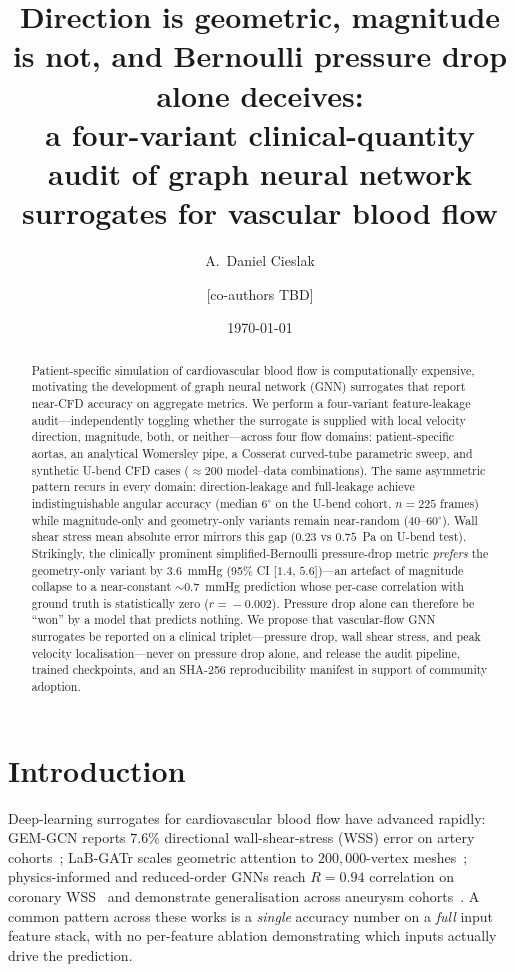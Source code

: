 \documentclass[10pt,a4paper]{article}
\title{\bfseries Direction is geometric, magnitude is not, and Bernoulli
pressure drop alone deceives:\\
a four-variant clinical-quantity audit of graph neural network surrogates
for vascular blood flow}
\author[1,*]{A.~Daniel Cieslak}
\author[1]{[co-authors TBD]}
\affil[1]{[Affiliation placeholder --- update before submission]}
\affil[*]{Correspondence: \texttt{cieslak.a.daniel@gmail.com}}
\date{\today}
\begin{document}
\maketitle
\linenumbers

\begin{abstract}
\noindent Patient-specific simulation of cardiovascular blood flow is
computationally expensive, motivating the development of graph neural
network (GNN) surrogates that report near-CFD accuracy on aggregate
metrics. We perform a four-variant feature-leakage audit---independently
toggling whether the surrogate is supplied with local velocity
direction, magnitude, both, or neither---across four flow domains:
patient-specific aortas, an analytical Womersley pipe, a Cosserat
curved-tube parametric sweep, and synthetic U-bend CFD cases
($\approx\!200$ model--data combinations). The same asymmetric pattern
recurs in every domain: direction-leakage and full-leakage achieve
indistinguishable angular accuracy (median $6^\circ$ on the U-bend
cohort, $n\!=\!225$ frames) while magnitude-only and geometry-only
variants remain near-random ($40$--$60^\circ$). Wall shear stress
mean absolute error mirrors this gap ($0.23$ vs $0.75$~Pa on U-bend
test). Strikingly, the clinically prominent simplified-Bernoulli
pressure-drop metric \emph{prefers} the geometry-only variant by
$3.6$~mmHg (95\% CI [$1.4$, $5.6$])---an artefact of magnitude
collapse to a near-constant $\sim\!0.7$~mmHg prediction whose
per-case correlation with ground truth is statistically zero
($r\!=\!-0.002$). Pressure drop alone can therefore be ``won'' by a
model that predicts nothing. We propose that vascular-flow GNN
surrogates be reported on a clinical triplet---pressure drop, wall
shear stress, and peak velocity localisation---never on pressure drop
alone, and release the audit pipeline, trained checkpoints, and an
SHA-256 reproducibility manifest in support of community adoption.
\end{abstract}

\section*{Introduction}

Deep-learning surrogates for cardiovascular blood flow have advanced
rapidly: GEM-GCN reports $7.6\%$ directional wall-shear-stress (WSS)
error on artery cohorts~\cite{suk2024gemgcn}; LaB-GATr scales geometric
attention to $200{,}000$-vertex meshes~\cite{suk2024labgatr};
physics-informed and reduced-order GNNs reach $R \!=\! 0.94$
correlation on coronary WSS~\cite{tabe2026pignn} and demonstrate
generalisation across aneurysm cohorts~\cite{wang2026npj}.
A common pattern across these works is a \emph{single} accuracy number
on a \emph{full} input feature stack, with no per-feature ablation
demonstrating which inputs actually drive the prediction.
\end{document}
